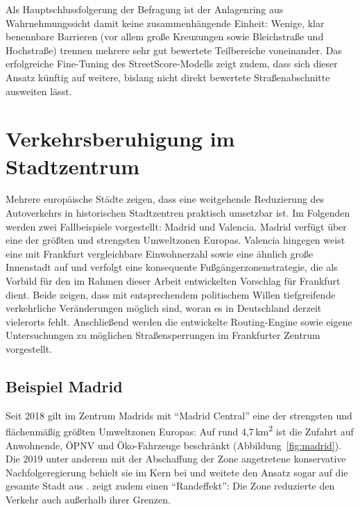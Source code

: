 \documentclass[a4paper,12pt]{article}
\begin{document}
Als Hauptschlussfolgerung der Befragung ist der Anlagenring aus Wahrnehmungssicht damit keine zusammenhängende Einheit: Wenige, klar benennbare Barrieren (vor allem große Kreuzungen sowie Bleichstraße und Hochstraße) trennen mehrere sehr gut bewertete Teilbereiche voneinander. Das erfolgreiche Fine-Tuning des StreetScore-Modells zeigt zudem, dass sich dieser Ansatz künftig auf weitere, bislang nicht direkt bewertete Straßenabschnitte ausweiten lässt.

\FloatBarrier

\clearpage
\section{Verkehrsberuhigung im Stadtzentrum}

Mehrere europäische Städte zeigen, dass eine weitgehende Reduzierung des Autoverkehrs in historischen Stadtzentren praktisch umsetzbar ist. Im Folgenden werden zwei Fallbeispiele vorgestellt: Madrid und Valencia. Madrid verfügt über eine der größten und strengsten Umweltzonen Europas. Valencia hingegen weist eine mit Frankfurt vergleichbare Einwohnerzahl sowie eine ähnlich große Innenstadt auf und verfolgt eine konsequente Fußgängerzonenstrategie, die als Vorbild für den im Rahmen dieser Arbeit entwickelten Vorschlag für Frankfurt dient. Beide zeigen, dass mit entsprechendem politischem Willen tiefgreifende verkehrliche Veränderungen möglich sind, woran es in Deutschland derzeit vielerorts fehlt. Anschließend werden die entwickelte Routing-Engine sowie eigene Untersuchungen zu möglichen Straßensperrungen im Frankfurter Zentrum vorgestellt.

\subsection{Beispiel Madrid}

Seit 2018 gilt im Zentrum Madrids mit \enquote{Madrid Central} eine der strengsten und flächenmäßig größten Umweltzonen Europas: Auf rund 4,7\,km\textsuperscript{2} ist die Zufahrt auf Anwohnende, ÖPNV und Öko-Fahrzeuge beschränkt \autocite{ayuntamientomadridcentral2018} (Abbildung~\ref{fig:madrid}). Die 2019 unter anderem mit der Abschaffung der Zone angetretene konservative Nachfolgeregierung behielt sie im Kern bei und weitete den Ansatz sogar auf die gesamte Stadt aus \autocite{ayuntamientomadridzbe2026}. \textcite{moralcarcedo2024} zeigt zudem einen \enquote{Randeffekt}: Die Zone reduzierte den Verkehr auch außerhalb ihrer Grenzen.
\end{document}
